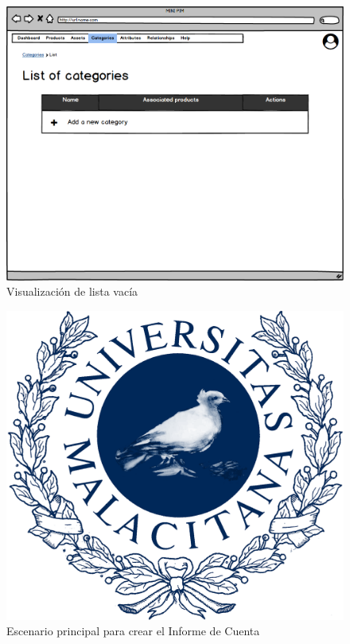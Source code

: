 \begin{figure}[H]
    \includegraphics[width=1\linewidth]{assets/mockups/RF4.2_2.png}
    \caption{Visualización de lista vacía}
   \end{figure}
\vspace{1.0cm}

\newpage %

\begin{figure}[H]
    \includegraphics[width=1\linewidth]{assets/umaLogo.png}
    \caption{Escenario principal para crear el Informe de Cuenta}
   \end{figure}
\vspace{1.0cm}

\newpage %